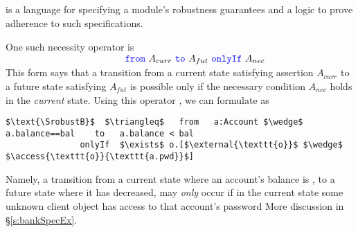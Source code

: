 \vspace{.04in}

\subsection{\Nec}
\label{intro:this:work}
\Nec is a language for specifying a module's robustness guarantees 
and a logic 
to prove adherence to such specifications.

%
%
%  
 One such necessity operator is \\
$ 
\strut \hspace{1.7in} {\color{blue}\texttt{from}}\ A_{curr}\ {\color{blue}\texttt{to}}\ A_{fut}\ {\color{blue}\texttt{onlyIf}}\ A_{nec}
$  
\\
This form says that  
a  {transition} from a current state satisfying assertion $A_{curr}$ to a future
state satisfying $A_{fut}$  is possible only if  the   necessary 
condition
$A_{nec}$ holds in the \emph{current} state.
Using this operator 
, 
we can formulate  \SrobustB  
as
\begin{lstlisting}[language = Chainmail, mathescape=true, frame=lines]
   $\text{\SrobustB}$  $\triangleq$   from   a:Account $\wedge$ a.balance==bal    to   a.balance < bal
               onlyIf  $\exists$ o.[$\external{\texttt{o}}$ $\wedge$ $\access{\texttt{o}}{\texttt{a.pwd}}$]
\end{lstlisting}
Namely, a transition from a  {current} state where an account's balance is , to a  {future} state where 
it has decreased, may \emph{only} occur if  {in the current state} some unknown client object  
has access to that account's password 
More discussion in \S\ref{s:bankSpecEx}. 


